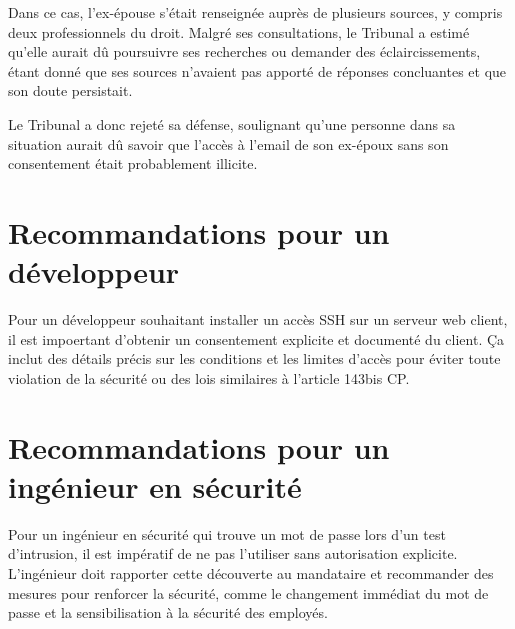 \documentclass[a4paper]{article}
\begin{document}
Dans ce cas, l'ex-épouse s'était renseignée auprès de plusieurs sources, y compris deux professionnels du droit. Malgré ses consultations, le Tribunal a estimé qu'elle aurait dû poursuivre ses recherches ou demander des éclaircissements, étant donné que ses sources  n'avaient pas apporté de réponses concluantes et que son doute persistait.

Le Tribunal a donc rejeté sa défense, soulignant qu'une personne dans sa situation aurait dû savoir que l'accès à l'email de son ex-époux sans son consentement était probablement illicite.


\section*{Recommandations pour un développeur}

Pour un développeur souhaitant installer un accès SSH sur un serveur web client, il est impoertant d'obtenir un consentement explicite et documenté du client. Ça inclut des détails précis sur les conditions et les limites d'accès pour éviter toute violation de la sécurité ou des lois similaires à l'article 143bis CP.

\section*{Recommandations pour un ingénieur en sécurité}

Pour un ingénieur en sécurité qui trouve un mot de passe lors d'un test d'intrusion, il est impératif de ne pas l'utiliser sans autorisation explicite. L'ingénieur doit rapporter cette découverte au mandataire et recommander des mesures pour renforcer la sécurité, comme le changement immédiat du mot de passe et la sensibilisation à la sécurité des employés.
\end{document}
